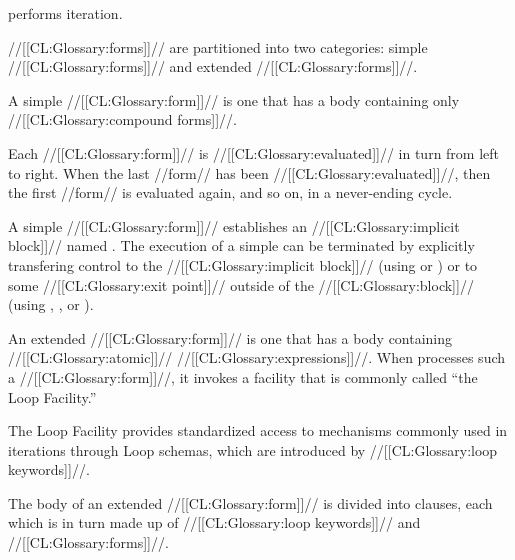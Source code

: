 


 performs iteration.


 //[[CL:Glossary:forms]]// are partitioned into two categories: 
     simple  //[[CL:Glossary:forms]]// 
 and extended  //[[CL:Glossary:forms]]//.


A simple  //[[CL:Glossary:form]]// is one that has a body containing
only //[[CL:Glossary:compound forms]]//.

Each //[[CL:Glossary:form]]// is //[[CL:Glossary:evaluated]]// in turn from left to right.
When the last //form// has been //[[CL:Glossary:evaluated]]//, 
then the first //form// is evaluated again, and so on, in a never-ending cycle.

A simple  //[[CL:Glossary:form]]// establishes an //[[CL:Glossary:implicit block]]// named \nil.
The execution of a simple  can be terminated by explicitly
transfering control to the //[[CL:Glossary:implicit block]]// (using  or
) or to some //[[CL:Glossary:exit point]]// outside of the //[[CL:Glossary:block]]// 
(\eg using , , or ).







\endsubsubsubsection%


An extended  //[[CL:Glossary:form]]// is one that has a body containing
//[[CL:Glossary:atomic]]// //[[CL:Glossary:expressions]]//.  When  processes such a
//[[CL:Glossary:form]]//, it invokes a facility that is commonly called ``the Loop Facility.''

The Loop Facility provides standardized access to mechanisms commonly used 
in iterations through Loop schemas, which are introduced by //[[CL:Glossary:loop keywords]]//.

The body of an extended  //[[CL:Glossary:form]]// is divided into  clauses,
each which is in turn made up of //[[CL:Glossary:loop keywords]]// and //[[CL:Glossary:forms]]//. 

